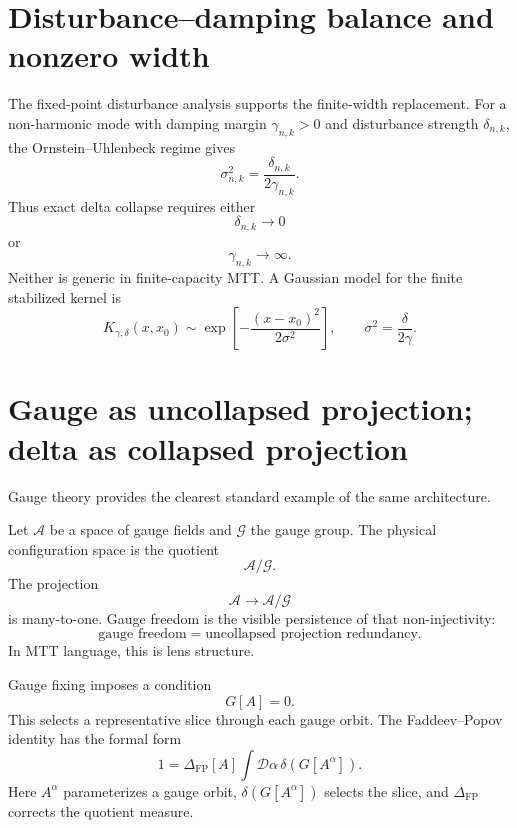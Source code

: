 \documentclass[11pt]{article}
\begin{document}
\section{Disturbance--damping balance and nonzero width}

The fixed-point disturbance analysis supports the finite-width replacement.  For a
non-harmonic mode with damping margin \(\gamma_{n,k}>0\) and disturbance strength
\(\delta_{n,k}\), the Ornstein--Uhlenbeck regime gives
\begin{equation}
\sigma^2_{n,k}=\frac{\delta_{n,k}}{2\gamma_{n,k}}.
\end{equation}
Thus exact delta collapse requires either
\begin{equation}
\delta_{n,k}\to 0
\end{equation}
or
\begin{equation}
\gamma_{n,k}\to\infty.
\end{equation}
Neither is generic in finite-capacity MTT.  A Gaussian model for the finite stabilized kernel is
\begin{equation}
K_{\gamma,\delta}(x,x_0)\sim
\exp\left[-\frac{(x-x_0)^2}{2\sigma^2}\right],
\qquad
\sigma^2=\frac{\delta}{2\gamma}.
\end{equation}

\section{Gauge as uncollapsed projection; delta as collapsed projection}

Gauge theory provides the clearest standard example of the same architecture.

Let \(\mathcal A\) be a space of gauge fields and \(\mathcal G\) the gauge group.  The
physical configuration space is the quotient
\begin{equation}
\mathcal A/\mathcal G.
\end{equation}
The projection
\begin{equation}
\mathcal A\to\mathcal A/\mathcal G
\end{equation}
is many-to-one.  Gauge freedom is the visible persistence of that non-injectivity:
\[
\boxed{\text{gauge freedom}=\text{uncollapsed projection redundancy}.}
\]
In MTT language, this is lens structure.

Gauge fixing imposes a condition
\begin{equation}
G[A]=0.
\end{equation}
This selects a representative slice through each gauge orbit.  The Faddeev--Popov identity
has the formal form
\begin{equation}
1=\Delta_{\mathrm{FP}}[A]\int \mathcal D\alpha\,
\delta(G[A^\alpha]).
\end{equation}
Here \(A^\alpha\) parameterizes a gauge orbit, \(\delta(G[A^\alpha])\) selects the slice,
and \(\Delta_{\mathrm{FP}}\) corrects the quotient measure.
\end{document}
